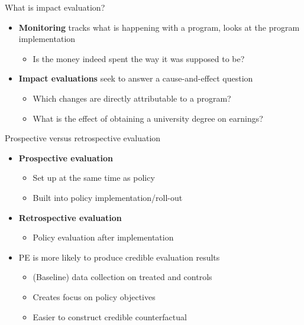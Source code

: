 \documentclass[
  ignorenonframetext,
]{beamer}
\providecommand{\tightlist}{%
  \setlength{\itemsep}{0pt}\setlength{\parskip}{0pt}}
\begin{document}
\begin{frame}{What is impact evaluation?}
\label{what-is-impact-evaluation}
\begin{itemize}
\tightlist
\item
  \textbf{Monitoring} tracks what is happening with a program, looks at
  the program implementation

  \begin{itemize}
  \tightlist
  \item
    Is the money indeed spent the way it was supposed to be?\\
  \end{itemize}
\item
  \textbf{Impact evaluations} seek to answer a cause-and-effect question

  \begin{itemize}
  \tightlist
  \item
    Which changes are directly attributable to a program?\\
  \item
    What is the effect of obtaining a university degree on earnings?
  \end{itemize}
\end{itemize}
\end{frame}

\begin{frame}{Prospective versus retrospective evaluation}
\label{prospective-versus-retrospective-evaluation}
\begin{itemize}
\tightlist
\item
  \textbf{Prospective evaluation}

  \begin{itemize}
  \tightlist
  \item
    Set up at the same time as policy\\
  \item
    Built into policy implementation/roll-out\\
  \end{itemize}
\item
  \textbf{Retrospective evaluation}

  \begin{itemize}
  \tightlist
  \item
    Policy evaluation after implementation\\
  \end{itemize}
\item
  PE is more likely to produce credible evaluation results

  \begin{itemize}
  \tightlist
  \item
    (Baseline) data collection on treated and controls\\
  \item
    Creates focus on policy objectives\\
  \item
    Easier to construct credible counterfactual
  \end{itemize}
\end{itemize}
\end{frame}
\end{document}

